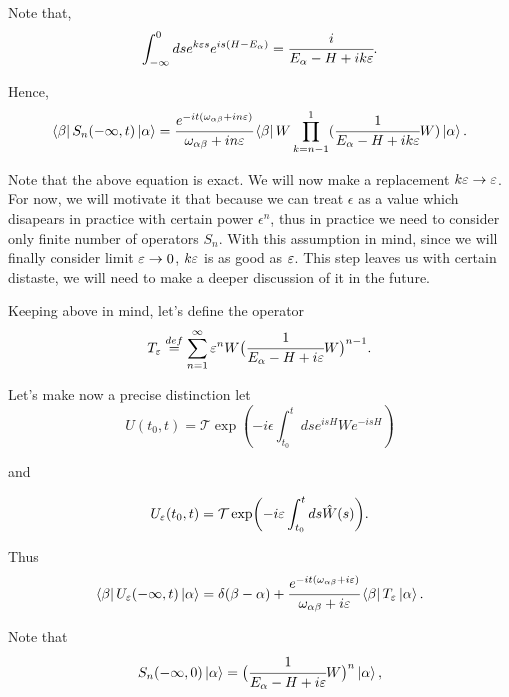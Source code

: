 \documentclass[main.tex]{subfiles}
\begin{document}
Note that,
\begin{equation}
 \int^0_{-\infty} ds e^{k\eepsilon s} e^{is(H - E_{\alpha})} = \cfrac{i}{E_\alpha - H + ik\eepsilon}.
\end{equation} 

Hence,
\begin{equation}
\bra{\beta}S_n (-\infty, t) \ket{\alpha} = \\
\cfrac{e^{-it(\omega_{\alpha\beta} +in\eepsilon)}}{\omega_{\alpha\beta}+in\eepsilon }
\bra{\beta} W \prod_{k = n - 1}^1 (\cfrac{1}{E_\alpha - H + ik\eepsilon}W) \ket{\alpha}.\\
\end{equation}

Note that the above equation is exact. We will now make a replacement $k\eepsilon \to \eepsilon$. For now, we will motivate it that because we can treat $\epsilon$ as a value which disapears in practice with certain power $\epsilon^n$, thus in practice we need to consider only finite number of operators $S_n$. With this assumption in mind, since we will finally consider limit $\eepsilon \to 0$, $k\eepsilon$ is as good as $\eepsilon$. This step leaves us with certain distaste, we will need to make a deeper discussion of it in the future.

Keeping above in mind, let's define the operator
\begin{equation}
\label{transition-operator}
T_{\eepsilon}  \stackrel{def}{=}  \sum_{n = 1}^\infty \epsilon^n W \big(\cfrac{1}{E_\alpha - H + i\eepsilon}W\big)^{n - 1}.
\end{equation}

Let's make now a precise distinction let
\begin{equation}
U(t_0, t) = \mathcal{T} \exp(-i\epsilon \int_{t_0}^t ds e^{isH}W e^{-isH})
\end{equation}

and

\begin{equation}
U_\eepsilon(t_0, t) = \mathcal{T} \exp(-i\epsilon \int_{t_0}^t ds \hat{W}(s)).
\end{equation}

Thus
\begin{equation}
\bra{\beta}U_\eepsilon (-\infty, t) \ket{\alpha} = \delta(\beta - \alpha) + \cfrac{e^{-it(\omega_{\alpha\beta} +i\eepsilon)}}{\omega_{\alpha\beta}+i\eepsilon } \bra{\beta}T_{\eepsilon} \ket{\alpha}.
\end{equation}

Note that
\begin{equation}
S_n (-\infty, 0) \ket{\alpha} =  \big(\cfrac{1}{E_\alpha - H + i\eepsilon}W\big)^n \ket{\alpha},
\end{equation}
\end{document}
